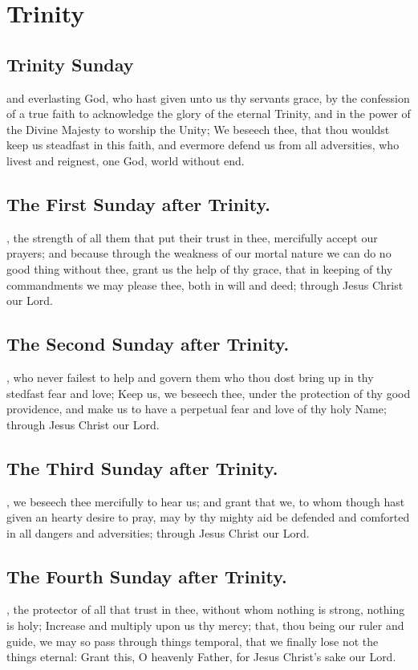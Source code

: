 \section{Trinity}

\subsection{Trinity Sunday}
 and everlasting God, who hast given unto us thy servants grace, by the confession of a true faith to acknowledge the glory of the eternal Trinity, and in the power of the Divine Majesty to worship the Unity; We beseech thee, that thou wouldst keep us steadfast in this faith, and evermore defend us from all adversities, who livest and reignest, one God, world without end.

\subsection{The First Sunday after Trinity.}
, the strength of all them that put their trust in thee, mercifully accept our prayers; and because through the weakness of our mortal nature we can do no good thing without thee, grant us the help of thy grace, that in keeping of thy commandments we may please thee, both in will and deed; through Jesus Christ our Lord.

\subsection{The Second Sunday after Trinity.}
, who never failest to help and govern them who thou dost bring up in thy stedfast fear and love; Keep us, we beseech thee, under the protection of thy good providence, and make us to have a perpetual fear and love of thy holy Name; through Jesus Christ our Lord.

\subsection{The Third Sunday after Trinity.}
, we beseech thee mercifully to hear us; and grant that we, to whom though hast given an hearty desire to pray, may by thy mighty aid be defended and comforted in all dangers and adversities; through Jesus Christ our Lord.

\subsection{The Fourth Sunday after Trinity.}
, the protector of all that trust in thee, without whom nothing is strong, nothing is holy; Increase and multiply upon us thy mercy; that, thou being our ruler and guide, we may so pass through things temporal, that we finally lose not the things eternal: Grant this, O heavenly Father, for Jesus Christ's sake our Lord.

